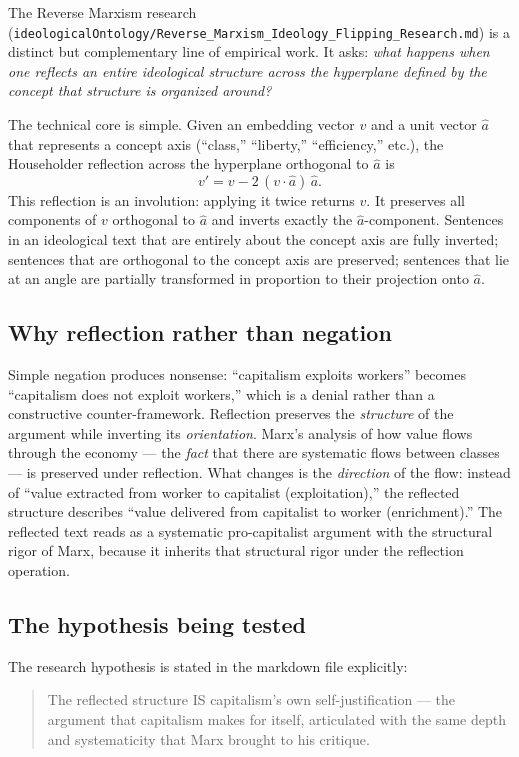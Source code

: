 \documentclass[11pt,letterpaper]{article}
\newcommand{\file}[1]{\texttt{#1}}
\begin{document}
The Reverse Marxism research (\file{ideologicalOntology/Reverse\_Marxism\_Ideology\_Flipping\_Research.md}) is a distinct but complementary line of empirical work. It asks: \emph{what happens when one reflects an entire ideological structure across the hyperplane defined by the concept that structure is organized around?}

The technical core is simple. Given an embedding vector $v$ and a unit vector $\hat{a}$ that represents a concept axis (``class,'' ``liberty,'' ``efficiency,'' etc.), the Householder reflection across the hyperplane orthogonal to $\hat{a}$ is
\[
v' = v - 2\,(v \cdot \hat{a})\,\hat{a}.
\]
This reflection is an involution: applying it twice returns $v$. It preserves all components of $v$ orthogonal to $\hat{a}$ and inverts exactly the $\hat{a}$-component. Sentences in an ideological text that are entirely about the concept axis are fully inverted; sentences that are orthogonal to the concept axis are preserved; sentences that lie at an angle are partially transformed in proportion to their projection onto $\hat{a}$.

\subsection{Why reflection rather than negation}

Simple negation produces nonsense: ``capitalism exploits workers'' becomes ``capitalism does not exploit workers,'' which is a denial rather than a constructive counter-framework. Reflection preserves the \emph{structure} of the argument while inverting its \emph{orientation}. Marx's analysis of how value flows through the economy --- the \emph{fact} that there are systematic flows between classes --- is preserved under reflection. What changes is the \emph{direction} of the flow: instead of ``value extracted from worker to capitalist (exploitation),'' the reflected structure describes ``value delivered from capitalist to worker (enrichment).'' The reflected text reads as a systematic pro-capitalist argument with the structural rigor of Marx, because it inherits that structural rigor under the reflection operation.

\subsection{The hypothesis being tested}

The research hypothesis is stated in the markdown file explicitly:

\begin{quote}
The reflected structure IS capitalism's own self-justification --- the argument that capitalism makes for itself, articulated with the same depth and systematicity that Marx brought to his critique.
\end{quote}
\end{document}
